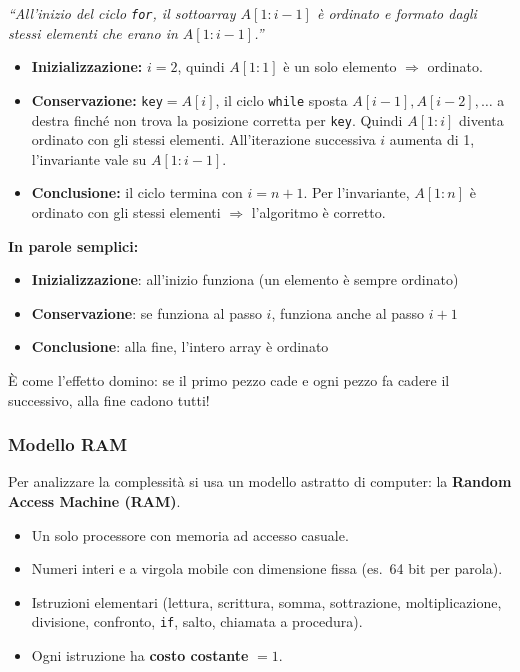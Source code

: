 \begin{esempio}
	\textit{``All'inizio del ciclo \texttt{for}, il sottoarray
		$A[1:i-1]$ è ordinato e formato dagli stessi elementi
		che erano in $A[1:i-1]$.''}
	
	\begin{itemize}
		\item \textbf{Inizializzazione:} $i=2$, quindi $A[1:1]$
		è un solo elemento $\Rightarrow$ ordinato. \checkmark
		\item \textbf{Conservazione:} \texttt{key}$= A[i]$,
		il ciclo \texttt{while} sposta $A[i-1], A[i-2],\ldots$
		a destra finché non trova la posizione corretta per
		\texttt{key}. Quindi $A[1:i]$ diventa ordinato con
		gli stessi elementi. All'iterazione successiva
		$i$ aumenta di 1, l'invariante vale su $A[1:i-1]$.
		\checkmark
		\item \textbf{Conclusione:} il ciclo termina con $i = n+1$.
		Per l'invariante, $A[1:n]$ è ordinato con gli stessi
		elementi $\Rightarrow$ l'algoritmo è corretto. \checkmark
	\end{itemize}
\end{esempio}

\begin{softnote}
	\textbf{In parole semplici:}
	\begin{itemize}
		\item \textbf{Inizializzazione}: all'inizio funziona (un elemento è sempre ordinato)
		\item \textbf{Conservazione}: se funziona al passo $i$, funziona anche al passo $i+1$
		\item \textbf{Conclusione}: alla fine, l'intero array è ordinato
	\end{itemize}
	
	È come l'effetto domino: se il primo pezzo cade e ogni pezzo fa cadere il successivo, alla fine cadono tutti!
\end{softnote}

\subsubsection*{Modello RAM}


Per analizzare la complessità si usa un modello astratto di
computer: la \textbf{Random Access Machine (RAM)}.

\begin{itemize}
	\item Un solo processore con memoria ad accesso casuale.
	\item Numeri interi e a virgola mobile con dimensione fissa
	(es.\ 64 bit per parola).
	\item Istruzioni elementari (lettura, scrittura, somma,
	sottrazione, moltiplicazione, divisione, confronto,
	\texttt{if}, salto, chiamata a procedura).
	\item Ogni istruzione ha \textbf{costo costante} $= 1$.
\end{itemize}

